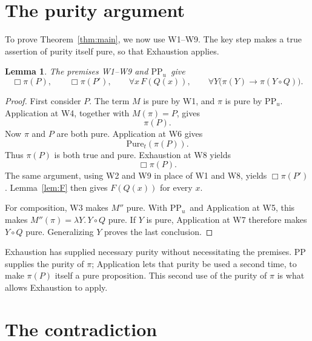 \documentclass[12pt,leqno]{article}
\newcommand{\IC}{\ensuremath{\rightarrow}}
\newcommand{\Pure}{\ensuremath{\mathrm{Pure}}}
\newcommand{\PPu}{\ensuremath{\mathrm{PP}_u}}
\theoremstyle{plain}
\newtheorem{lemma}{Lemma}
\begin{document}
\section{The purity argument}

To prove Theorem~\ref{thm:main}, we now use W1--W9. The key step makes
a true assertion of purity itself pure, so that Exhaustion applies.

\begin{lemma}\label{lem:G}
The premises W1--W9 and \PPu\ give
\[
 \Box\pi(P),\qquad \Box\pi(P'),\qquad
 \forall x\,F(Q(x)),\qquad
 \forall Y\bigl(\pi(Y)\IC\pi(Y\circ Q)\bigr).
\]
\end{lemma}
\begin{proof}
First consider \(P\). The term \(M\) is pure by W1, and \(\pi\) is
pure by \PPu. Application at W4, together with \(M(\pi)=P\), gives
\[
 \pi(P).
\]
Now \(\pi\) and \(P\) are both pure. Application at W6 gives
\[
 \Pure_t(\pi(P)).
\]
Thus \(\pi(P)\) is both true and pure. Exhaustion at W8 yields
\[
 \Box\pi(P).
\]
The same argument, using W2 and W9 in place of W1 and W8, yields
\(\Box\pi(P')\). Lemma~\ref{lem:F} then gives \(F(Q(x))\) for every \(x\).

For composition, W3 makes \(M''\) pure. With \PPu\ and Application
at W5, this makes \(M''(\pi)=\lambda Y.\,Y\circ Q\) pure.
If \(Y\) is pure, Application at W7 therefore makes \(Y\circ Q\) pure.
Generalizing \(Y\) proves the last conclusion.
\end{proof}

Exhaustion has supplied necessary purity without necessitating the
premises. PP supplies the purity of \(\pi\); Application lets
that purity be used a second time, to make \(\pi(P)\) itself a pure
proposition. This second use of the purity of \(\pi\) is what allows
Exhaustion to apply.

\section{The contradiction}
\end{document}
